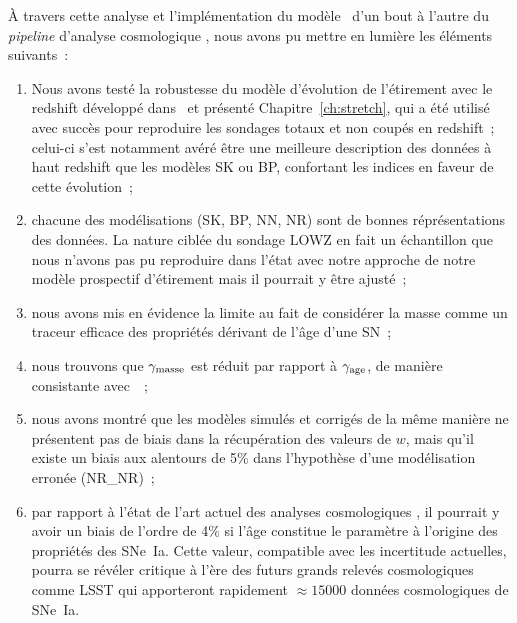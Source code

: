 \documentclass[../main/main.tex]{subfiles}
\begin{document}
À travers cette analyse et l'implémentation du modèle~
d'un bout à l'autre du \textit{pipeline} d'analyse cosmologique \snana, nous
avons pu mettre en lumière les éléments suivants~:
\begin{enumerate}
    \item Nous avons testé la robustesse du modèle d'évolution de l'étirement
        avec le redshift développé dans~\cite{nicolas2021} et présenté
        Chapitre~\ref{ch:stretch}, qui a été utilisé avec succès pour reproduire
        les sondages totaux et non coupés en redshift~; celui-ci s'est notamment
        avéré être une meilleure description des données à haut redshift que les
        modèles SK ou BP, confortant les indices en faveur de cette évolution~;
    \item chacune des modélisations (SK, BP, NN, NR) sont de bonnes
        réprésentations des données. La nature ciblée du sondage LOWZ en fait
        un échantillon que nous n'avons pas pu reproduire dans l'état avec notre
        approche de notre modèle prospectif d'étirement mais il pourrait y être
        ajusté~;
    \item nous avons mis en évidence la limite au fait de considérer la masse
        comme un traceur efficace des propriétés dérivant de l'âge d'une SN~;
    \item nous trouvons que $\gamma_{\rm masse}$ est réduit par rapport à
        $\gamma_{\rm age}$, de manière consistante avec~\cite{briday2022}~;
    \item nous avons montré que les modèles simulés et corrigés de la même
        manière ne présentent pas de biais dans la récupération des valeurs de
        $w$, mais qu'il existe un biais aux alentours de 5\% dans l'hypothèse
        d'une modélisation erronée (NR\_NR)~;
    \item par rapport à l'état de l'art actuel des analyses cosmologiques
        , il pourrait y avoir un biais de l'ordre de
        4\% si l'âge constitue le paramètre à l'origine des propriétés des
        SNe~Ia. Cette valeur, compatible avec les incertitude actuelles, pourra
        se révéler critique à l'ère des futurs grands relevés cosmologiques
        comme LSST qui apporteront rapidement $\approx \num{15000}$ données
        cosmologiques de SNe~Ia.
\end{enumerate}
\end{document}
